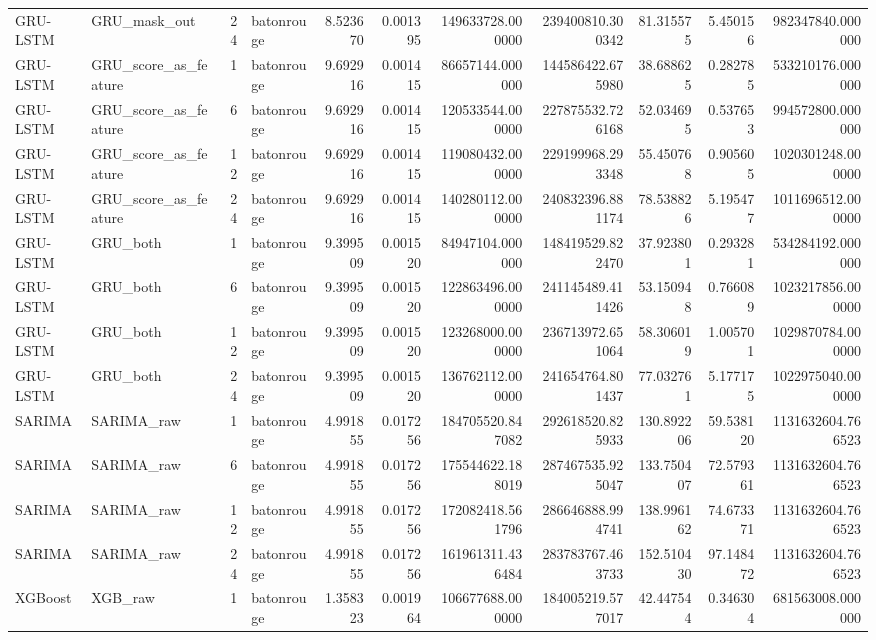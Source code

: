 \begin{longtable}{llrlrrrrrrr}
GRU-LSTM & GRU\_mask\_out & 24 & batonrouge & 8.523670 & 0.001395 & 149633728.000000 & 239400810.300342 & 81.315575 & 5.450156 & 982347840.000000 \\
GRU-LSTM & GRU\_score\_as\_feature & 1 & batonrouge & 9.692916 & 0.001415 & 86657144.000000 & 144586422.675980 & 38.688625 & 0.282785 & 533210176.000000 \\
GRU-LSTM & GRU\_score\_as\_feature & 6 & batonrouge & 9.692916 & 0.001415 & 120533544.000000 & 227875532.726168 & 52.034695 & 0.537653 & 994572800.000000 \\
GRU-LSTM & GRU\_score\_as\_feature & 12 & batonrouge & 9.692916 & 0.001415 & 119080432.000000 & 229199968.293348 & 55.450768 & 0.905605 & 1020301248.000000 \\
GRU-LSTM & GRU\_score\_as\_feature & 24 & batonrouge & 9.692916 & 0.001415 & 140280112.000000 & 240832396.881174 & 78.538826 & 5.195477 & 1011696512.000000 \\
GRU-LSTM & GRU\_both & 1 & batonrouge & 9.399509 & 0.001520 & 84947104.000000 & 148419529.822470 & 37.923801 & 0.293281 & 534284192.000000 \\
GRU-LSTM & GRU\_both & 6 & batonrouge & 9.399509 & 0.001520 & 122863496.000000 & 241145489.411426 & 53.150948 & 0.766089 & 1023217856.000000 \\
GRU-LSTM & GRU\_both & 12 & batonrouge & 9.399509 & 0.001520 & 123268000.000000 & 236713972.651064 & 58.306019 & 1.005701 & 1029870784.000000 \\
GRU-LSTM & GRU\_both & 24 & batonrouge & 9.399509 & 0.001520 & 136762112.000000 & 241654764.801437 & 77.032761 & 5.177175 & 1022975040.000000 \\
SARIMA & SARIMA\_raw & 1 & batonrouge & 4.991855 & 0.017256 & 184705520.847082 & 292618520.825933 & 130.892206 & 59.538120 & 1131632604.766523 \\
SARIMA & SARIMA\_raw & 6 & batonrouge & 4.991855 & 0.017256 & 175544622.188019 & 287467535.925047 & 133.750407 & 72.579361 & 1131632604.766523 \\
SARIMA & SARIMA\_raw & 12 & batonrouge & 4.991855 & 0.017256 & 172082418.561796 & 286646888.994741 & 138.996162 & 74.673371 & 1131632604.766523 \\
SARIMA & SARIMA\_raw & 24 & batonrouge & 4.991855 & 0.017256 & 161961311.436484 & 283783767.463733 & 152.510430 & 97.148472 & 1131632604.766523 \\
XGBoost & XGB\_raw & 1 & batonrouge & 1.358323 & 0.001964 & 106677688.000000 & 184005219.577017 & 42.447544 & 0.346304 & 681563008.000000 \\

\end{longtable}
